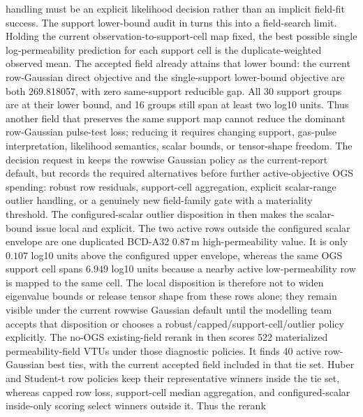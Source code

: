 handling must be an explicit likelihood decision rather than an implicit field-fit
success.
The support lower-bound audit in
 turns this into a
field-search limit.  Holding the current observation-to-support-cell map fixed, the
best possible single log-permeability prediction for each support cell is the
duplicate-weighted observed mean.  The accepted field already attains that lower
bound: the current row-Gaussian direct objective and the single-support lower-bound
objective are both 269.818057, with zero same-support reducible gap.  All 30 support
groups are at their lower bound, and 16 groups still span at least two log10 units.
Thus another field that preserves the same support map cannot reduce the dominant
row-Gaussian pulse-test loss; reducing it requires changing support, gas-pulse
interpretation, likelihood semantics, scalar bounds, or tensor-shape freedom.
The decision request in
 keeps the
rowwise Gaussian policy as the current-report default, but records the required
alternatives before further active-objective OGS spending: robust row residuals,
support-cell aggregation, explicit scalar-range outlier handling, or a genuinely new
field-family gate with a materiality threshold.
The configured-scalar outlier disposition in
then makes the scalar-bound issue local and explicit.  The two active rows outside
the configured scalar envelope are one duplicated BCD-A32 \(0.87\,\mathrm{m}\)
high-permeability value.  It is only \(0.107\) log10 units above the configured
upper envelope, whereas the same OGS support cell spans \(6.949\) log10 units
because a nearby active low-permeability row is mapped to the same cell.  The local
disposition is therefore not to widen eigenvalue bounds or release tensor shape
from these rows alone; they remain visible under the current rowwise Gaussian
default until the modelling team accepts that disposition or chooses a
robust/capped/support-cell/outlier policy explicitly.
The no-OGS existing-field rerank in
 then scores
522 materialized permeability-field VTUs under those diagnostic policies.  It finds
40 active row-Gaussian best ties, with the current accepted field included in that
tie set.  Huber and Student-t row policies keep their representative winners inside
the tie set, whereas capped row loss, support-cell median aggregation, and
configured-scalar inside-only scoring select winners outside it.  Thus the rerank
